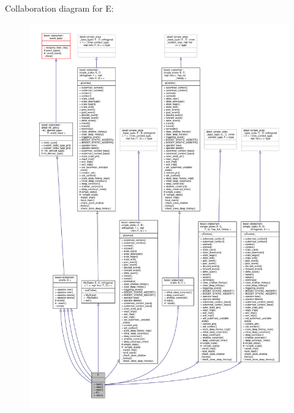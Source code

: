 Collaboration diagram for E\+:
\nopagebreak
\begin{figure}[H]
\begin{center}
\leavevmode
\includegraphics[width=350pt]{struct_e__coll__graph}
\end{center}
\end{figure}
